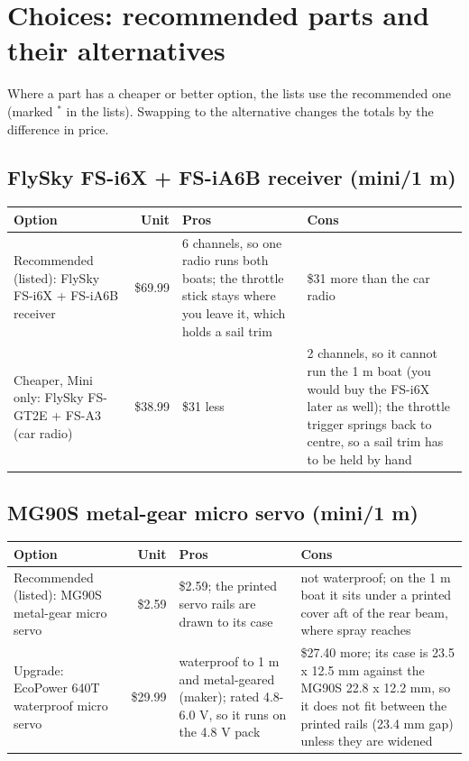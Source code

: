 \documentclass[11pt]{article}
\begin{document}
\section*{Choices: recommended parts and their alternatives}
Where a part has a cheaper or better option, the lists use the recommended one (marked $^\ast$ in the lists). Swapping to the alternative changes the totals by the difference in price.
\subsection*{FlySky FS-i6X + FS-iA6B receiver \normalfont\small (mini/1 m)}
{\small
\begin{longtable}{L{3.6cm}rL{5.4cm}L{5.4cm}}
\toprule
Option & Unit & Pros & Cons \\
\midrule
Recommended (listed): FlySky FS-i6X + FS-iA6B receiver & \$69.99 & 6 channels, so one radio runs both boats; the throttle stick stays where you leave it, which holds a sail trim & \$31 more than the car radio \\
Cheaper, Mini only: FlySky FS-GT2E + FS-A3 (car radio) & \$38.99 & \$31 less & 2 channels, so it cannot run the 1 m boat (you would buy the FS-i6X later as well); the throttle trigger springs back to centre, so a sail trim has to be held by hand \\
\bottomrule
\end{longtable}}
\subsection*{MG90S metal-gear micro servo \normalfont\small (mini/1 m)}
{\small
\begin{longtable}{L{3.6cm}rL{5.4cm}L{5.4cm}}
\toprule
Option & Unit & Pros & Cons \\
\midrule
Recommended (listed): MG90S metal-gear micro servo & \$2.59 & \$2.59; the printed servo rails are drawn to its case & not waterproof; on the 1 m boat it sits under a printed cover aft of the rear beam, where spray reaches \\
Upgrade: EcoPower 640T waterproof micro servo & \$29.99 & waterproof to 1 m and metal-geared (maker); rated 4.8-6.0 V, so it runs on the 4.8 V pack & \$27.40 more; its case is 23.5 x 12.5 mm against the MG90S 22.8 x 12.2 mm, so it does not fit between the printed rails (23.4 mm gap) unless they are widened \\
\bottomrule
\end{longtable}}
\end{document}
